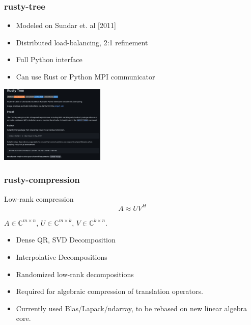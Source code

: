 \documentclass[dvipsnames,10pt]{beamer}
\begin{document}
\begin{frame}
\frametitle{rusty-tree}

\begin{minipage}{5cm}
\begin{itemize}
\item Modeled on Sundar et. al [2011]
\item Distributed load-balancing, 2:1 refinement
\item Full Python interface
\item Can use Rust or Python MPI communicator
\end{itemize}
\end{minipage}
\begin{minipage}{5cm}
\includegraphics[width=5cm]{../figs/rusty_tree}
\end{minipage}

\end{frame}

\begin{frame}
\frametitle{rusty-compression}
\begin{minipage}{5cm}

\begin{tcolorbox}
Low-rank compression
$$
A\approx UV^H
$$

$A\in\mathbb{C}^{m\times n}$, $U\in\mathbb{C}^{m\times k}$, $V\in\mathbb{C}^{k\times n}$.
\end{tcolorbox}
\end{minipage}
\begin{minipage}{5cm}
\begin{itemize}
\item Dense QR, SVD Decomposition
\item Interpolative Decompositions
\item Randomized low-rank decompositions
\end{itemize}
\end{minipage}

\vspace{2\baselineskip}

\begin{itemize}
\item Required for algebraic compression of translation operators.
\item Currently used Blas/Lapack/ndarray, to be rebased on new linear algebra core.
\end{itemize}
\end{frame}
\end{document}
